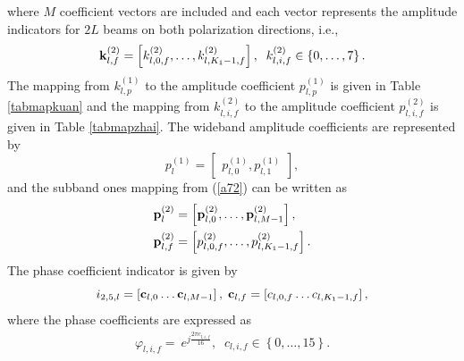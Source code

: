 \documentclass[lettersize,journal]{IEEEtran}
\begin{document}
where $M$ coefficient vectors are included and each vector represents the amplitude indicators for $2L$ beams on both polarization directions, i.e.,
\begin{equation}
{\bf{k}}_{l,f}^{(2)}=\left[k_{l,0,f}^{(2)},\ldots, k_{l,K_1-1,f}^{(2)}\right], \;\;k_{l,i,f}^{(2)}\in\left\{0,\ldots,7\right\}.
\end{equation}
The mapping from $k_{l,p}^{(1)}$ to the amplitude coefficient $p_{l,p}^{(1)}$ is given in Table \ref{tabmapkuan} and the mapping from $k_{l,i,f}^{(2)}$ to the amplitude coefficient $p_{l,i,f}^{(2)}$ is given in Table \ref{tabmapzhai}. The wideband amplitude coefficients are represented by 
\begin{equation}
p_l^{\left( 1 \right)} = \left[ {\begin{aligned}
{p_{l,0}^{\left( 1 \right)}},{p_{l,1}^{\left( 1 \right)}}
\end{aligned}} \right],   
\end{equation}
and the subband ones mapping from (\ref{a72}) can be written as
\begin{equation}
\begin{aligned}
{\bf{p}}_l^{(2)} &= \left[ {{\bf{p}}_{l,0}^{(2)}, \ldots ,{\bf{p}}_{l,{M } - 1}^{(2)}} \right],\\
{\bf{p}}_{l,f}^{(2)} &= \left[ {p_{l,0,f}^{(2)}, \ldots ,p_{l,K_1 - 1,f}^{(2)}} \right].
\end{aligned}
\end{equation}
The phase coefficient indicator is given by 
\begin{equation}
 {i_{2,5,l}} = \left[ {{{\bf{c}}_{l,0}} \ldots {{\bf{c}}_{l,{M } - 1}}} \right], \; {{\bf{c}}_{l,f}} = \left[ {{c_{l,0,f}} \ldots {c_{l,K_1 - 1,f}}} \right],  
\end{equation}
where the phase coefficients are expressed as 
\begin{equation}
\begin{aligned}
\varphi_{l,i,f}=\ e^{j\frac{2\pi c_{l,i,f}}{16}},\;\;{c_{l,i,f}} \in \left\{ {0, \ldots ,15} \right\}.
\end{aligned}
\end{equation}
\end{document}
